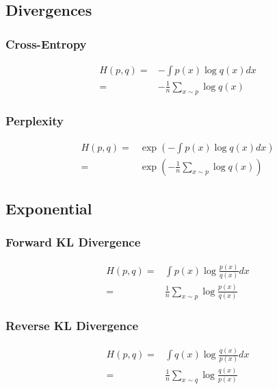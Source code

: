 \subsection{Divergences}

\subsubsection{Cross-Entropy}
\begin{equation}
  \begin{aligned}
    H(p, q) =& - \int p(x) \log q(x) dx \\
    =& - \frac{1}{n} \sum_{x \sim p} \log q(x)
  \end{aligned}
\end{equation}
\subsubsection{Perplexity}
\begin{equation}
  \begin{aligned}
    H(p, q) =& \exp \left( - \int p(x) \log q(x) dx \right) \\
    =& \exp \left(- \frac{1}{n} \sum_{x \sim p} \log q(x) \right)
  \end{aligned}
\end{equation}

\subsection{Exponential}

\subsubsection{Forward KL Divergence}
\begin{equation}
  \begin{aligned}
    H(p, q) =& \int p(x) \log \frac{p(x)}{q(x)} dx  \\
    =&  \frac{1}{n} \sum_{x \sim p} \log \frac{p(x)}{q(x)}
  \end{aligned}
\end{equation}
\subsubsection{Reverse KL Divergence}
\begin{equation}
  \begin{aligned}
    H(p, q) =& \int q(x) \log \frac{q(x)}{p(x)} dx  \\
    =&  \frac{1}{n} \sum_{x \sim q} \log \frac{q(x)}{p(x)}
  \end{aligned}
\end{equation}
